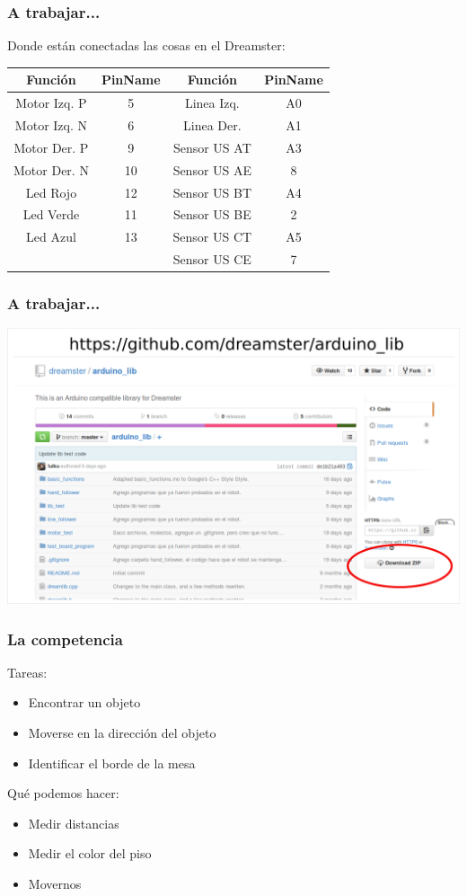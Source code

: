 \documentclass[compress]{beamer}
\begin{document}
\begin{frame}
\frametitle{A trabajar...}
Donde están conectadas las cosas en el Dreamster:
\begin{center}
\begin{tabular}{|c|c|c|c|}
\hline
\textbf{Función} & \textbf{PinName} & \textbf{Función} & \textbf{PinName}\\\hline
Motor Izq. P & 5 & Linea Izq. & A0\\\hline
Motor Izq. N & 6 & Linea Der. & A1\\\hline
Motor Der. P & 9 & Sensor US AT & A3\\\hline
Motor Der. N & 10 & Sensor US AE & 8\\\hline
Led Rojo & 12 & Sensor US BT & A4\\\hline
Led Verde & 11 & Sensor US BE & 2\\\hline
Led Azul & 13 & Sensor US CT & A5\\\hline
& & Sensor US CE & 7 \\\hline
\end{tabular}
\end{center}
\end{frame}

\begin{frame}
\frametitle{A trabajar...}
\begin{center}
 \includegraphics[width=\textwidth]{./img/github.png}
\end{center}
\end{frame}


\begin{frame}
 \frametitle{La competencia}
Tareas:
\begin{itemize}
 \item Encontrar un objeto
 \item Moverse en la dirección del objeto
 \item Identificar el borde de la mesa
\end{itemize}
Qué podemos hacer:
\begin{itemize}
 \item Medir distancias
 \item Medir el color del piso
 \item Movernos
\end{itemize}
\end{frame}
\end{document}
